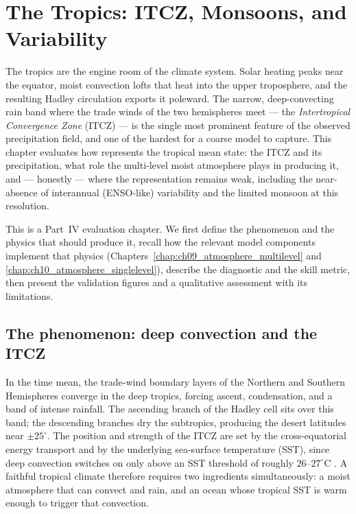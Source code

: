 \chapter{The Tropics: ITCZ, Monsoons, and Variability}
\label{chap:ch19_tropics_monsoon}

The tropics are the engine room of the climate system. Solar heating peaks near the equator,
moist convection lofts that heat into the upper troposphere, and the resulting Hadley
circulation exports it poleward. The narrow, deep-convecting rain band where the trade winds of
the two hemispheres meet --- the \emph{Intertropical Convergence Zone} (ITCZ) --- is the single
most prominent feature of the observed precipitation field, and one of the hardest for a coarse
model to capture. This chapter evaluates how \model{} represents the tropical mean state: the
ITCZ and its precipitation, what role the multi-level moist atmosphere plays in producing it,
and --- honestly --- where the representation remains weak, including the near-absence of
interannual (ENSO-like) variability and the limited monsoon at this resolution.

This is a Part~IV evaluation chapter. We first define the phenomenon and the physics that should
produce it, recall how the relevant model components implement that physics
(Chapters~\ref{chap:ch09_atmosphere_multilevel} and \ref{chap:ch10_atmosphere_singlelevel}),
describe the diagnostic and the skill metric, then present the validation figures and a
qualitative assessment with its limitations.

\section{The phenomenon: deep convection and the ITCZ}

In the time mean, the trade-wind boundary layers of the Northern and Southern Hemispheres
converge in the deep tropics, forcing ascent, condensation, and a band of intense rainfall. The
ascending branch of the Hadley cell sits over this band; the descending branches dry the
subtropics, producing the desert latitudes near $\pm25^\circ$. The position and strength of the
ITCZ are set by the cross-equatorial energy transport and by the underlying sea-surface
temperature (SST), since deep convection switches on only above an SST threshold of roughly
$26$--$27^\circ$C \citep{vallis2017}. A faithful tropical climate therefore requires two
ingredients simultaneously: a moist atmosphere that can convect and rain, and an ocean whose
tropical SST is warm enough to trigger that convection.

